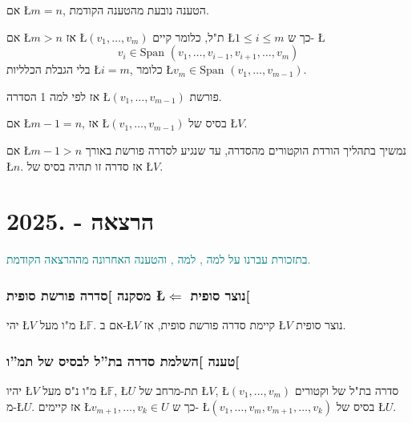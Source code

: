 \documentclass[english,hebrew]{article}
\newcommand{\spn}{\text{Span }}
\begin{document}
אם \L{$m=n$}, הטענה נובעת מהטענה הקודמת.

אם \L{$m>n$} אז \L{$(v_{1},\dots,v_{m})$} ת"ל, כלומר קיים \L{$1\le i\le m$}
כך ש- \L{%
\[
v_{i}\in\spn(v_{1},\dots,v_{i-1},v_{i+1},\dots,v_{m})
\]
}%
בלי הגבלת הכלליות \L{$i=m$}, כלומר \L{$v_{m}\in\spn(v_{1},\dots,v_{m-1})$}.

אז לפי למה 1 הסדרה \L{$(v_{1},\dots,v_{m-1})$} פורשת.

אם \L{$m-1=n$}, אז \L{$(v_{1},\dots,v_{m-1})$} בסיס של \L{$V$}.

אם \L{$m-1>n$} נמשיך בתהליך הורדת הוקטורים מהסדרה, עד שנגיע לסדרה
פורשת באורך \L{$n$}. אז סדרה זו תהיה בסיס של \L{$V$}.

\newpage{}

\noindent{}

\part{הרצאה {\endL} - {.2025\endL}}

\textcolor{teal}{בתזכורת עברנו על למה }\textcolor{teal}{{}\endL}\textcolor{teal}{,
למה }\textcolor{teal}{{}\endL}\textcolor{teal}{, והטענה האחרונה
מההרצאה הקודמת.}

\section{מסקנה {]}סדרה פורשת סופית \L{$\Leftarrow$} נוצר סופית{[}}

יהי \L{$V$} מ"ו מעל \L{$\mathbb{F}$}. אם ב-\L{$V$} קיימת סדרה
פורשת סופית, אז \L{$V$} נוצר סופית.

\section{טענה {]}השלמת סדרה בת\textquotedblright ל לבסיס של תמ\textquotedblright ו{[}}

יהיו \L{$V$} מ"ו נ"ס מעל \L{$\mathbb{F}$}, \L{$U$} תת-מרחב של
\L{$V$}, \L{$(v_{1},\dots,v_{m})$} סדרה בת"ל של וקטורים מ-\L{$U$}.
אז קיימים \L{$v_{m+1},\dots,v_{k}\in U$} כך ש- \L{$(v_{1},\dots,v_{m},v_{m+1},\dots,v_{k})$}
בסיס של \L{$U$}.
\end{document}
